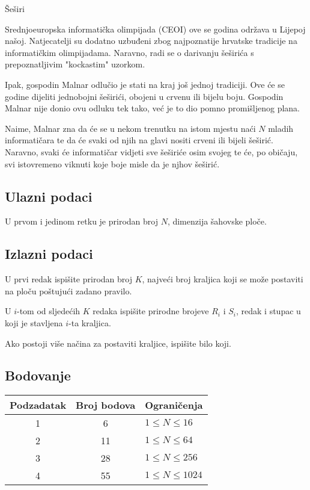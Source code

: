 \begin{statement}[
  problempoints=100,
  timelimit=1 sekunda,
  memorylimit=512 MiB,
]{Šeširi}

Srednjoeuropska informatička olimpijada (CEOI) ove se godina održava u Lijepoj
našoj. Natjecatelji su dodatno uzbuđeni zbog najpoznatije hrvatske tradicije na
informatičkim olimpijadama. Naravno, radi se o darivanju šeširića s
prepoznatljivim "kockastim" uzorkom.

Ipak, gospodin Malnar odlučio je stati na kraj još jednoj tradiciji. Ove će se
godine dijeliti jednobojni šeširići, obojeni u crvenu ili bijelu boju. Gospodin
Malnar nije donio ovu odluku tek tako, već je to dio pomno promišljenog plana.

Naime, Malnar zna da će se u nekom trenutku na istom mjestu naći $N$ mladih
informatičara te da će svaki od njih na glavi nositi crveni ili bijeli
šeširić.  Naravno, svaki će informatičar vidjeti sve šeširiće osim svojeg te
će, po običaju, svi istovremeno viknuti koje boje misle da je njhov šeširić.


\subsection*{Ulazni podaci}
U prvom i jedinom retku je prirodan broj $N$, dimenzija šahovske ploče.

\subsection*{Izlazni podaci}

U prvi redak ispišite prirodan broj $K$, najveći broj kraljica koji se može postaviti na ploču poštujući zadano pravilo.

U $i$-tom od sljedećih $K$ redaka ispišite prirodne brojeve $R_i$ i $S_i$, redak i stupac u koji je stavljena $i$-ta kraljica.

Ako postoji više načina za postaviti kraljice, ispišite bilo koji.

\subsection*{Bodovanje}
{\renewcommand{\arraystretch}{1.4}
  \setlength{\tabcolsep}{6pt}
  \begin{tabular}{ccl}
 Podzadatak & Broj bodova & Ograničenja \\ \midrule
  1 & 6 & $1 \le N \le 16$\\
  2 & 11 & $1 \le N \le 64$\\
  3 & 28 & $1 \le N \le 256$\\
  4 & 55 & $1 \le N \le 1024$\\
\end{tabular}}


\end{statement}

